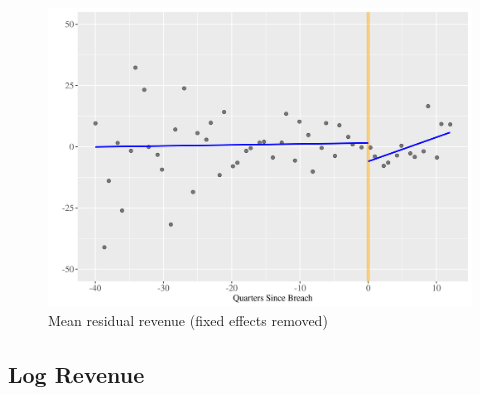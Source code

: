 \documentclass[../Main.tex]{subfiles}
\begin{document}
\FloatBarrier

\begin{figure}
    \centering
    \caption{Mean residual revenue (fixed effects removed)}
    \label{revfig}
    \includegraphics[width=\textwidth]{Images/mean_resid_revenue_3y.png}
\end{figure}

\FloatBarrier
\clearpage

\subsection{Log Revenue}
\end{document}
